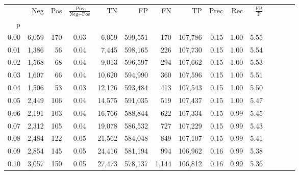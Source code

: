 \begin{tabular}{rrrcrrrrrrrrrrr}
\toprule
{} &     Neg &    Pos & $\frac{\text{Pos}}{\text{Neg}+\text{Pos}}$ &       TN &       FP &       FN &       TP &  Prec &   Rec & $\frac{\text{FP}}{\text{P}}$ \\
p    &         &        &                                            &          &          &          &          &       &       &                              \\
\midrule
0.00 &   6,059 &    170 &                                       0.03 &    6,059 &  599,551 &      170 &  107,786 &  0.15 &  1.00 &                         5.55 \\
0.01 &   1,386 &     56 &                                       0.04 &    7,445 &  598,165 &      226 &  107,730 &  0.15 &  1.00 &                         5.54 \\
0.02 &   1,568 &     68 &                                       0.04 &    9,013 &  596,597 &      294 &  107,662 &  0.15 &  1.00 &                         5.53 \\
0.03 &   1,607 &     66 &                                       0.04 &   10,620 &  594,990 &      360 &  107,596 &  0.15 &  1.00 &                         5.51 \\
0.04 &   1,506 &     53 &                                       0.03 &   12,126 &  593,484 &      413 &  107,543 &  0.15 &  1.00 &                         5.50 \\
0.05 &   2,449 &    106 &                                       0.04 &   14,575 &  591,035 &      519 &  107,437 &  0.15 &  1.00 &                         5.47 \\
0.06 &   2,191 &    103 &                                       0.04 &   16,766 &  588,844 &      622 &  107,334 &  0.15 &  0.99 &                         5.45 \\
0.07 &   2,312 &    105 &                                       0.04 &   19,078 &  586,532 &      727 &  107,229 &  0.15 &  0.99 &                         5.43 \\
0.08 &   2,484 &    122 &                                       0.05 &   21,562 &  584,048 &      849 &  107,107 &  0.15 &  0.99 &                         5.41 \\
0.09 &   2,854 &    145 &                                       0.05 &   24,416 &  581,194 &      994 &  106,962 &  0.16 &  0.99 &                         5.38 \\
0.10 &   3,057 &    150 &                                       0.05 &   27,473 &  578,137 &    1,144 &  106,812 &  0.16 &  0.99 &                         5.36 \\

\end{tabular}
